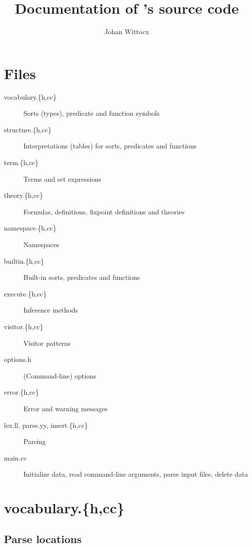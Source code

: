 \documentclass{article}
\title{Documentation of \gidl's source code}
\author{Johan Wittocx}
\begin{document}
\maketitle

\section{Files}

\begin{description}
	\item[vocabulary.\{h,cc\}] Sorts (types), predicate and function symbols
	\item[structure.\{h,cc\}] Interpretations (tables) for sorts, predicates and functions
	\item[term.\{h,cc\}] Terms and set expressions
	\item[theory.\{h,cc\}] Formulas, definitions, fixpoint definitions and theories
	\item[namespace.\{h,cc\}] Namespaces
	\item[builtin.\{h,cc\}] Built-in sorts, predicates and functions
	\item[execute.\{h,cc\}] Inference methods
	\item[visitor.\{h,cc\}] Visitor patterns
	\item[options.h] (Command-line) options
	\item[error.\{h,cc\}] Error and warning messages
	\item[lex.ll, parse.yy, insert.\{h,cc\}] Parsing
	\item[main.cc] Initialize data, read command-line arguments, parse input files, delete data
\end{description}

\section{vocabulary.\{h,cc\}}

\subsection*{Parse locations}
\end{document}
